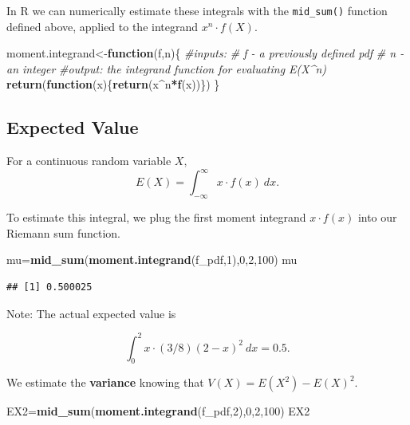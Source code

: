 \documentclass[
]{book}
\newenvironment{Shaded}{\begin{snugshade}}{\end{snugshade}}
\newcommand{\CommentTok}[1]{\textcolor[rgb]{0.56,0.35,0.01}{\textit{#1}}}
\newcommand{\ControlFlowTok}[1]{\textcolor[rgb]{0.13,0.29,0.53}{\textbf{#1}}}
\newcommand{\DecValTok}[1]{\textcolor[rgb]{0.00,0.00,0.81}{#1}}
\newcommand{\FunctionTok}[1]{\textcolor[rgb]{0.13,0.29,0.53}{\textbf{#1}}}
\newcommand{\NormalTok}[1]{#1}
\newcommand{\OtherTok}[1]{\textcolor[rgb]{0.56,0.35,0.01}{#1}}
\newcommand{\SpecialCharTok}[1]{\textcolor[rgb]{0.81,0.36,0.00}{\textbf{#1}}}
\theoremstyle{definition}
\theoremstyle{definition}
\theoremstyle{definition}
\theoremstyle{definition}
\theoremstyle{remark}
\begin{document}
In R we can numerically estimate these integrals with the \texttt{mid\_sum()} function defined above, applied to the integrand \(x^n\cdot f(X)\).

\begin{Shaded}
\begin{Highlighting}[]
\NormalTok{moment.integrand}\OtherTok{\textless{}{-}}\ControlFlowTok{function}\NormalTok{(f,n)\{}
  \CommentTok{\#inputs:}
      \CommentTok{\# f {-} a previously defined pdf}
      \CommentTok{\# n {-} an integer}
  \CommentTok{\#output: the integrand function for evaluating E(X\^{}n)}
  \FunctionTok{return}\NormalTok{(}\ControlFlowTok{function}\NormalTok{(x)\{}\FunctionTok{return}\NormalTok{(x}\SpecialCharTok{\^{}}\NormalTok{n}\SpecialCharTok{*}\FunctionTok{f}\NormalTok{(x))\})}
\NormalTok{\}}
\end{Highlighting}
\end{Shaded}

\subsection*{Expected Value}\label{expected-value-1}

For a continuous random variable \(X,\) \[E(X)=\int_{-\infty}^{\infty} x \cdot f(x)~dx.\]

To estimate this integral, we plug the first moment integrand \(x \cdot f(x)\) into our Riemann sum function.

\begin{Shaded}
\begin{Highlighting}[]
\NormalTok{mu}\OtherTok{=}\FunctionTok{mid\_sum}\NormalTok{(}\FunctionTok{moment.integrand}\NormalTok{(f\_pdf,}\DecValTok{1}\NormalTok{),}\DecValTok{0}\NormalTok{,}\DecValTok{2}\NormalTok{,}\DecValTok{100}\NormalTok{)}
\NormalTok{mu}
\end{Highlighting}
\end{Shaded}

\begin{verbatim}
## [1] 0.500025
\end{verbatim}

Note: The actual expected value is

\[\int_0^2 x \cdot (3/8)(2-x)^2~dx = 0.5.\]

We estimate the \textbf{variance} knowing that \(V(X) = E(X^2)-E(X)^2.\)

\begin{Shaded}
\begin{Highlighting}[]
\NormalTok{EX2}\OtherTok{=}\FunctionTok{mid\_sum}\NormalTok{(}\FunctionTok{moment.integrand}\NormalTok{(f\_pdf,}\DecValTok{2}\NormalTok{),}\DecValTok{0}\NormalTok{,}\DecValTok{2}\NormalTok{,}\DecValTok{100}\NormalTok{)}
\NormalTok{EX2}
\end{Highlighting}
\end{Shaded}
\end{document}
